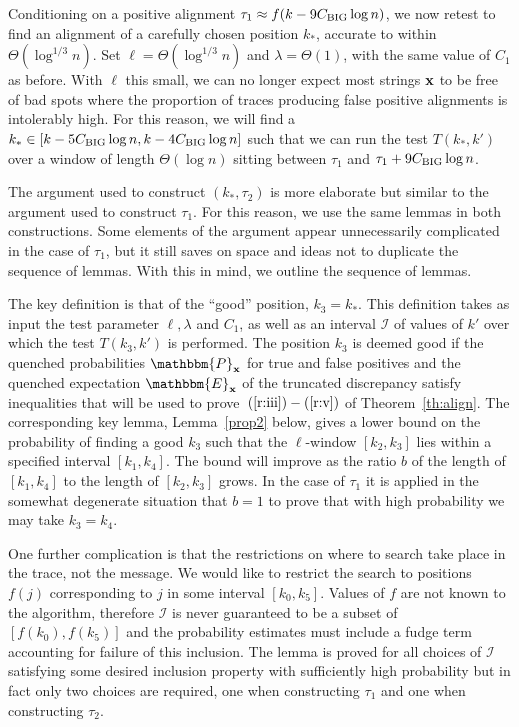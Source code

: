 \documentclass[final,12pt]{colt2018} %
\newcommand{\E}{\mathbbm{E}}
\renewcommand{\P}{\mathbbm{P}}
\newcommand{\1}{\mathbf{1}}
\def\cI{\mathcal{I}}
\def\x{{\bf x}}
\def\chuge{C_{\rm BIG}}
\begin{document}
Conditioning on a positive alignment $\tau_1 \approx f(k - 9 \chuge \log n)$,
we now retest to find an alignment of a carefully chosen position $k_*$,
accurate to within $\Theta (\log^{1/3} n)$.  Set $\ell  = \Theta (\log^{1/3} n)$ and $\lambda = \Theta (1)$, with
the same value of $C_1$ as before.  With $\ell$ this small, we can no
longer expect most strings $\x$ to be free of bad spots where the
proportion of traces producing false positive alignments is intolerably
high.  For this reason, we will find a $k_* \in [k - 5 \chuge \log n ,
k - 4 \chuge \log n]$ such that we can run the test $T(k_* , k')$ over
a window of length $\Theta (\log n)$ sitting between $\tau_1$ and
$\tau_1 + 9 \chuge \log n$.

The argument used to construct $(k_* , \tau_2)$ is more elaborate but
similar to the argument used to construct $\tau_1$.  For this reason,
we use the same lemmas in both constructions.  Some elements of the
argument appear unnecessarily complicated in the case of $\tau_1$, but
it still saves on space and ideas not to duplicate the sequence of
lemmas.  With this in mind, we outline the sequence of lemmas.

The key definition is that of the ``good'' position, $k_3=k_*$.  This
definition takes as input the test parameter $\ell, \lambda$ and
$C_1$, as well as an interval $\cI$ of values of $k'$ over which the
test $T(k_3 , k')$ is performed.  The position $k_3$ is deemed good if
the quenched probabilities $\P_\x$ for true and false positives and the
quenched expectation $\E_\x$ of the truncated discrepancy
satisfy inequalities that will be used to prove~$(\ref{r:iii})-(\ref{r:v})$
of Theorem~\ref{th:align}.  The corresponding key lemma,
Lemma~\ref{prop2} below, gives a lower bound on the probability
of finding a good $k_3$ such that the $\ell$-window $[k_2 , k_3]$
lies within a specified interval $[k_1,k_4]$.  The bound will improve
as the ratio $b$ of the length of $[k_1,k_4]$ to the length of $[k_2,k_3]$
grows.  In the case of $\tau_1$ it is applied in the somewhat degenerate
situation that $b=1$ to prove that with high probability
we may take $k_3 = k_4$.

One further complication is that the restrictions on where to search
take place in the trace, not the message.  We would like to restrict
the search to positions $f(j)$ corresponding to $j$ in some interval
$[k_0 , k_5]$.  Values of $f$ are not known to the algorithm,
therefore $\cI$ is never guaranteed to be a subset of
$[f(k_0) , f(k_5)]$ and the probability estimates must include
a fudge term accounting for failure of this inclusion.  The lemma
is proved for all choices of $\cI$ satisfying some desired inclusion property with sufficiently high probability but in fact only two choices are
required, one when constructing $\tau_1$ and one when constructing
$\tau_2$.
\end{document}
